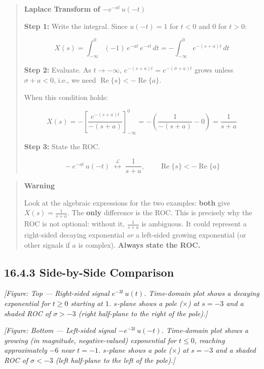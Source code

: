 \documentclass[11pt]{article}
\begin{document}
\begin{quote}
\textbf{Laplace Transform of $-e^{-at}\,u(-t)$}

\textbf{Step 1:} Write the integral. Since $u(-t) = 1$ for $t < 0$ and $0$ for $t > 0$:

\[X(s) = \int_{-\infty}^{0} (-1)\,e^{-at}\,e^{-st}\,dt = -\int_{-\infty}^{0} e^{-(s+a)t}\,dt\]

\textbf{Step 2:} Evaluate. As $t \to -\infty$, $e^{-(s+a)t} = e^{-(\sigma+a)t}$ grows unless $\sigma + a < 0$, i.e., we need $\operatorname{Re}\{s\} < -\operatorname{Re}\{a\}$.

When this condition holds:

\[X(s) = -\left[\frac{e^{-(s+a)t}}{-(s+a)}\right]_{-\infty}^{0} = -\left(\frac{1}{-(s+a)} - 0\right) = \frac{1}{s+a}\]

\textbf{Step 3:} State the ROC.

\[\boxed{\,-e^{-at}\,u(-t) \;\overset{\mathcal{L}}{\longleftrightarrow}\; \frac{1}{s+a}, \qquad \operatorname{Re}\{s\} < -\operatorname{Re}\{a\}\,}\]
\end{quote}

\begin{quote}
\textbf{Warning}

Look at the algebraic expressions for the two examples: \textbf{both} give $X(s) = \frac{1}{s+a}$. The \textbf{only} difference is the ROC. This is precisely why the ROC is not optional: without it, $\frac{1}{s+a}$ is ambiguous. It could represent a right-sided decaying exponential \textit{or} a left-sided growing exponential (or other signals if $a$ is complex). \textbf{Always state the ROC.}
\end{quote}

\subsection*{16.4.3 Side-by-Side Comparison}

\textit{[Figure: Top — Right-sided signal $e^{-3t}\,u(t)$. Time-domain plot shows a decaying exponential for $t \geq 0$ starting at $1$. $s$-plane shows a pole ($\times$) at $s = -3$ and a shaded ROC of $\sigma > -3$ (right half-plane to the right of the pole).]}

\textit{[Figure: Bottom — Left-sided signal $-e^{-3t}\,u(-t)$. Time-domain plot shows a growing (in magnitude, negative-valued) exponential for $t \leq 0$, reaching approximately $-6$ near $t = -1$. $s$-plane shows a pole ($\times$) at $s = -3$ and a shaded ROC of $\sigma < -3$ (left half-plane to the left of the pole).]}
\end{document}
